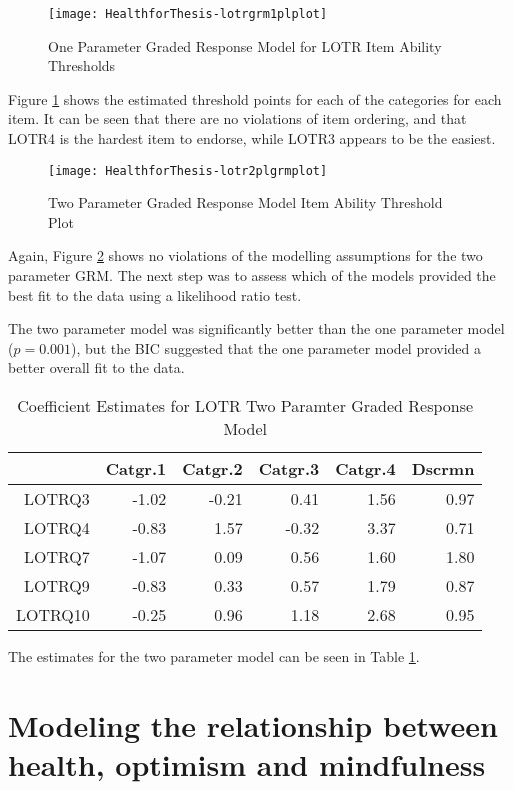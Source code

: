 \documentclass{article}
\begin{document}
\begin{figure}
\texttt{[image: HealthforThesis-lotrgrm1plplot]}
  \caption{One Parameter Graded Response Model for LOTR Item Ability Thresholds}
  \label{fig:lotr1plgrm}
\end{figure}

Figure \ref{fig:lotr1plgrm} shows the estimated threshold points for each of the categories for each item. It can be seen that there are no violations of item ordering, and that LOTR4 is the hardest item to endorse, while LOTR3 appears to be the easiest. 

\begin{figure}
\texttt{[image: HealthforThesis-lotr2plgrmplot]}
  \caption{Two Parameter Graded Response Model Item Ability Threshold Plot}
  \label{fig:lotr2plgrm}
\end{figure}


Again, Figure \ref{fig:lotr2plgrm} shows no violations of the modelling assumptions for the two parameter GRM. The next step was to assess which of the models provided the best fit to the data using a likelihood ratio test.


The two parameter model was significantly better than the one parameter model ($p=0.001$), but the BIC suggested that the one parameter model provided a better overall fit to the data. 

\begin{table}[ht]
\centering
\begin{tabular}{rrrrrr}
  \hline
 & Catgr.1 & Catgr.2 & Catgr.3 & Catgr.4 & Dscrmn \\ 
  \hline
LOTRQ3 & -1.02 & -0.21 & 0.41 & 1.56 & 0.97 \\ 
  LOTRQ4 & -0.83 & 1.57 & -0.32 & 3.37 & 0.71 \\ 
  LOTRQ7 & -1.07 & 0.09 & 0.56 & 1.60 & 1.80 \\ 
  LOTRQ9 & -0.83 & 0.33 & 0.57 & 1.79 & 0.87 \\ 
  LOTRQ10 & -0.25 & 0.96 & 1.18 & 2.68 & 0.95 \\ 
   \hline
\end{tabular}
\caption{Coefficient Estimates for LOTR Two Paramter Graded Response Model} 
\label{tab:lotr2plestimates}
\end{table}
The estimates for the two parameter model can be seen in Table \ref{tab:lotr2plestimates}.

\section{Modeling the relationship between health, optimism and mindfulness}
\label{sec:model-relat-betw}
\end{document}
